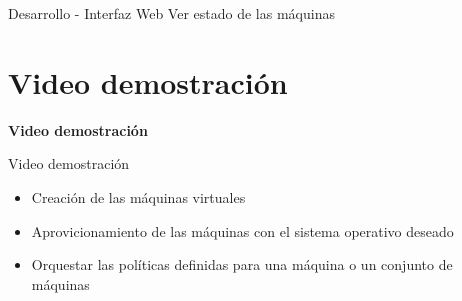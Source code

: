 \begin{frame}{Desarrollo - Interfaz Web}
    \vspace{0cm} {Ver estado de las máquinas}
    \vspace{0cm}
    \begin{figure}[ht]
       \centering
    \end{figure}

\end{frame}


\section{Video demostración}
\begin{frame}
    \Huge
    \centering
    \textbf{Video demostración}

\end{frame}

\begin{frame}{Video demostración}
    \vspace{-1.5cm}
    \begin{itemize}
        \item Creación de las máquinas virtuales
        \item Aprovicionamiento de las máquinas con el sistema operativo deseado
        \item Orquestar las políticas definidas para una máquina o un conjunto de máquinas
    \end{itemize}

\end{frame}



